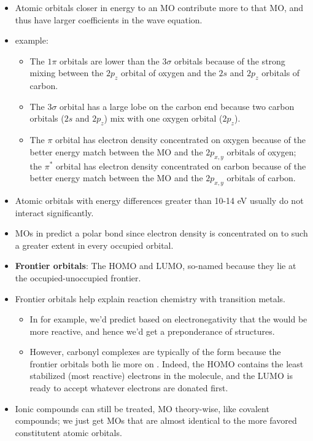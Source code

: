 \documentclass[../notes.tex]{subfiles}
\begin{document}
\begin{itemize}
    \item Atomic orbitals closer in energy to an MO contribute more to that MO, and thus have larger coefficients in the wave equation.
    \item {} example:
    \begin{itemize}
        \item The $1\pi$ orbitals are lower than the $3\sigma$ orbitals because of the strong mixing between the $2p_z$ orbital of oxygen and the $2s$ and $2p_z$ orbitals of carbon.
        \item The $3\sigma$ orbital has a large lobe on the carbon end because two carbon orbitals ($2s$ and $2p_z$) mix with one oxygen orbital ($2p_z$).
        \item The $\pi$ orbital has electron density concentrated on oxygen because of the better energy match between the MO and the $2p_{x,y}$ orbitals of oxygen; the $\pi^*$ orbital has electron density concentrated on carbon because of the better energy match between the MO and the $2p_{x,y}$ orbitals of carbon.
    \end{itemize}
    \item Atomic orbitals with energy differences greater than 10-14 eV usually do not interact significantly.
    \item MOs in  predict a polar bond since electron density is concentrated on  to such a greater extent in every occupied orbital.
    \item \textbf{Frontier orbitals}: The HOMO and LUMO, so-named because they lie at the occupied-unoccupied frontier.
    \item Frontier orbitals help explain reaction chemistry with transition metals.
    \begin{itemize}
        \item In  for example, we'd predict based on electronegativity that the  would be more reactive, and hence we'd get a preponderance of  structures.
        \item However, carbonyl complexes are typically of the form  because the frontier orbitals both lie more on . Indeed, the HOMO contains the least stabilized (most reactive) electrons in the molecule, and the LUMO is ready to accept whatever electrons are donated first.
    \end{itemize}
    \item Ionic compounds can still be treated, MO theory-wise, like covalent compounds; we just get MOs that are almost identical to the more favored constitutent atomic orbitals.

\end{itemize}
\end{document}
